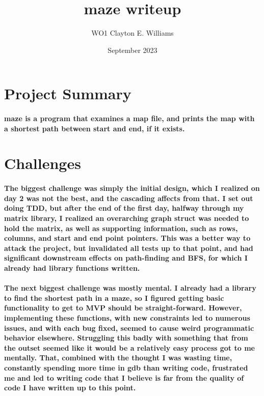 \documentclass{report}
\title{maze writeup}
\author{WO1 Clayton E. Williams}
\date{September 2023}
\begin{document}
\maketitle

\section{Project Summary}
\paragraph{maze is a program that examines a map file, and prints the map with a shortest
path between start and end, if it exists.}

\section{Challenges}
\paragraph{The biggest challenge was simply the initial design, which I realized on day 2 was not the
best, and the cascading affects from that. I set out doing TDD, but after the end of the first day,
halfway through my matrix library, I realized an overarching graph struct was needed to hold the
matrix, as well as supporting information, such as rows, columns, and start and end point pointers.
This was a better way to attack the project, but invalidated all tests up to that point, and had
significant downstream effects on path-finding and BFS, for which I already had library functions written.}
\paragraph{The next biggest challenge was mostly mental. I already had a library to find the shortest path in
a maze, so I figured getting basic functionality to get to MVP should be straight-forward. However,
implementing these functions, with new constraints led to numerous issues, and with each bug fixed, seemed
to cause weird programmatic behavior elsewhere. Struggling this badly with something that from the outset
seemed like it would be a relatively easy process got to me mentally. That, combined with the thought
I was wasting time, constantly spending more time in gdb than writing code, frustrated me and led to
writing code that I believe is far from the quality of code I have written up to this point.}
\end{document}
